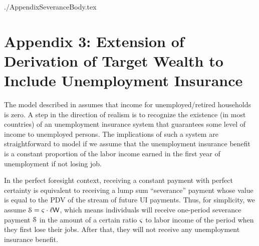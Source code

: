 \documentclass{\econtex}
\begin{document}


\begin{verbatimwrite}{./AppendixSeveranceBody.tex}


\section*{Appendix 3: Extension of Derivation of Target Wealth to Include Unemployment Insurance}\label{apdxUI}

The model described in \cite{ctDiscrete} assumes that income for
unemployed/retired households is zero.  A step in the direction of
realism is to recognize the existence (in most countries) of an unemployment
insurance system that guarantees some level of income to unemployed
persons.  The implications of such a system are straightforward to
model if we assume that the unemployment insurance benefit is a
constant proportion of the labor income earned in the first year of unemployment if not losing job.

In the perfect foresight context, receiving a constant payment with
perfect certainty is equivalent to receiving a lump sum ``severance''
payment whose value is equal to the PDV of the stream of future UI
payments.  Thus, for simplicity, we assume
$\mathcal{S}=\varsigma\cdot\ell\mathsf{W}$, which means
individuals will receive one-period severance payment $\mathcal{S}$ in the amount of
a certain ratio $\varsigma$ to labor income of the period when they first lose their jobs. After that, they will not receive any unemployment
insurance benefit.


\end{verbatimwrite}
\end{document}
